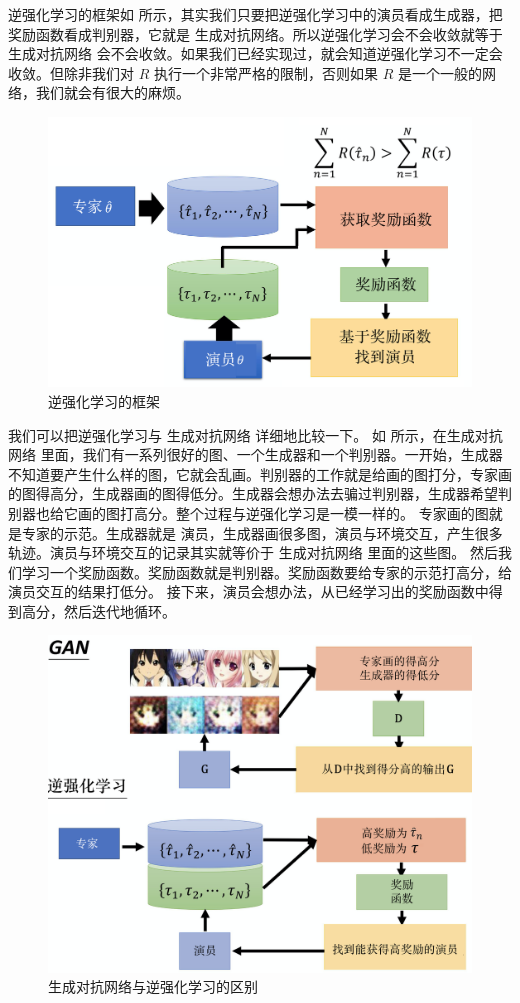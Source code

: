 逆强化学习的框架如 所示，其实我们只要把逆强化学习中的演员看成生成器，把奖励函数看成判别器，它就是 生成对抗网络。所以逆强化学习会不会收敛就等于 生成对抗网络 会不会收敛。如果我们已经实现过，就会知道逆强化学习不一定会收敛。但除非我们对 $R$ 执行一个非常严格的限制，否则如果 $R$ 是一个一般的网络，我们就会有很大的麻烦。
\begin{figure}[htb]
   \centering
   \includegraphics[width=0.5\linewidth]{res/ch11/11.8}
   \caption{逆强化学习的框架}
   \label{fig:fig11.8}
\end{figure}

我们可以把逆强化学习与 生成对抗网络 详细地比较一下。
如 所示，在生成对抗网络 里面，我们有一系列很好的图、一个生成器和一个判别器。一开始，生成器不知道要产生什么样的图，它就会乱画。判别器的工作就是给画的图打分，专家画的图得高分，生成器画的图得低分。生成器会想办法去骗过判别器，生成器希望判别器也给它画的图打高分。整个过程与逆强化学习是一模一样的。
专家画的图就是专家的示范。生成器就是 演员，生成器画很多图，演员与环境交互，产生很多轨迹。演员与环境交互的记录其实就等价于 生成对抗网络 里面的这些图。
然后我们学习一个奖励函数。奖励函数就是判别器。奖励函数要给专家的示范打高分，给演员交互的结果打低分。
接下来，演员会想办法，从已经学习出的奖励函数中得到高分，然后迭代地循环。

\begin{figure}[htb]
   \centering
   \includegraphics[width=0.5\linewidth]{res/ch11/11.9}
   \caption{生成对抗网络与逆强化学习的区别}
   \label{fig:fig11.9}
\end{figure}


